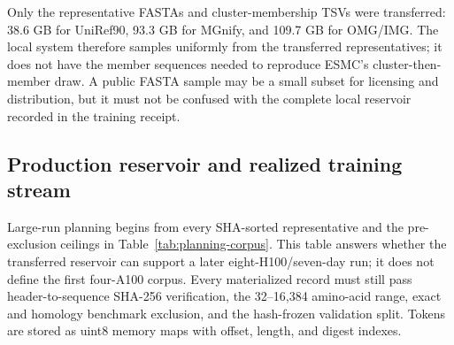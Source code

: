 \documentclass{article}
\begin{document}
\begin{table}[H]
  \centering
  \scriptsize
  \setlength{\tabcolsep}{3.2pt}
  \caption{Full-corpus production funnel. ``Wrong source'' removes non-IMG/JGI records from the OMG payload. Exact unique is source-present membership after global sequence deduplication; a sequence may remain eligible in more than one source arm. Clustering uses 70\% identity and 80\% coverage.}
  \label{tab:transfer}
\end{table}

Only the representative FASTAs and cluster-membership TSVs were transferred:
38.6 GB for UniRef90, 93.3 GB for MGnify, and 109.7 GB for OMG/IMG. The local
system therefore samples uniformly from the transferred representatives; it
does not have the member sequences needed to reproduce ESMC's
cluster-then-member draw. A public FASTA sample may be a small subset for
licensing and distribution, but it must not be confused with the complete local
reservoir recorded in the training receipt.

\subsection{Production reservoir and realized training stream}

Large-run planning begins from every SHA-sorted representative and the
pre-exclusion ceilings in Table~\ref{tab:planning-corpus}. This table answers
whether the transferred reservoir can support a later eight-H100/seven-day
run; it does not define the first four-A100 corpus. Every materialized record
must still pass header-to-sequence SHA-256 verification, the 32--16,384
amino-acid range, exact and homology benchmark exclusion, and the hash-frozen
validation split. Tokens are stored as uint8 memory maps with offset, length,
and digest indexes.
\end{document}
